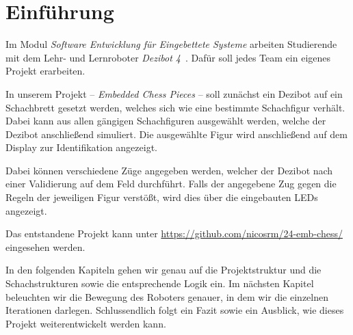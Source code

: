 
\section{Einführung}

Im Modul \emph{Software Entwicklung für Eingebettete Systeme} arbeiten Studierende mit dem Lehr- und Lernroboter \emph{Dezibot 4}~\cite{dezibotteamDezibotDezibot2025}. Dafür soll jedes Team ein eigenes Projekt erarbeiten.

In unserem Projekt -- \emph{Embedded Chess Pieces} -- soll zunächst ein Dezibot auf ein Schachbrett gesetzt werden, welches sich wie eine bestimmte Schachfigur verhält. Dabei kann aus allen gängigen Schachfiguren ausgewählt werden, welche der Dezibot anschließend simuliert. Die ausgewählte Figur wird anschließend auf dem Display zur Identifikation angezeigt.

Dabei können verschiedene Züge angegeben werden, welcher der Dezibot nach einer Validierung auf dem Feld durchführt. Falls der angegebene Zug gegen die Regeln der jeweiligen Figur verstößt, wird dies über die eingebauten LEDs angezeigt.

Das entstandene Projekt kann unter \url{https://github.com/nicosrm/24-emb-chess/} eingesehen werden.

In den folgenden Kapiteln gehen wir genau auf die Projektstruktur und die Schachstrukturen sowie die entsprechende Logik ein. Im nächsten Kapitel beleuchten wir die Bewegung des Roboters genauer, in dem wir die einzelnen Iterationen darlegen. Schlussendlich folgt ein Fazit sowie ein Ausblick, wie dieses Projekt weiterentwickelt werden kann.
